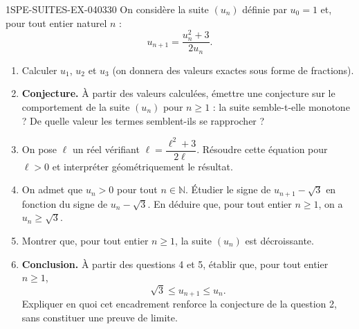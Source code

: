 \begin{exercice}{1SPE-SUITES-EX-040}{3}{30}
On considère la suite $(u_n)$ définie par $u_0 = 1$ et, pour tout entier naturel $n$ :
\[
  u_{n+1} = \frac{u_n^2 + 3}{2u_n}.
\]

\begin{enumerate}
  \item Calculer $u_1$, $u_2$ et $u_3$ (on donnera des valeurs exactes sous forme de fractions).

  \item \textbf{Conjecture.} À partir des valeurs calculées, émettre une conjecture sur le comportement de la suite $(u_n)$ pour $n \geq 1$ : la suite semble-t-elle monotone ? De quelle valeur les termes semblent-ils se rapprocher ?

  \item On pose $\ell$ un réel vérifiant $\ell = \dfrac{\ell^2 + 3}{2\ell}$. Résoudre cette équation pour $\ell > 0$ et interpréter géométriquement le résultat.

  \item On admet que $u_n > 0$ pour tout $n \in \mathbb{N}$. Étudier le signe de $u_{n+1} - \sqrt{3}$ en fonction du signe de $u_n - \sqrt{3}$. En déduire que, pour tout entier $n \geq 1$, on a $u_n \geq \sqrt{3}$.

  \item Montrer que, pour tout entier $n \geq 1$, la suite $(u_n)$ est décroissante.

  \item \textbf{Conclusion.} À partir des questions 4 et 5, établir que, pour tout entier $n \geq 1$,
  \[
    \sqrt{3} \leq u_{n+1} \leq u_n.
  \]
  Expliquer en quoi cet encadrement renforce la conjecture de la question 2, sans constituer une preuve de limite.
\end{enumerate}
\end{exercice}
